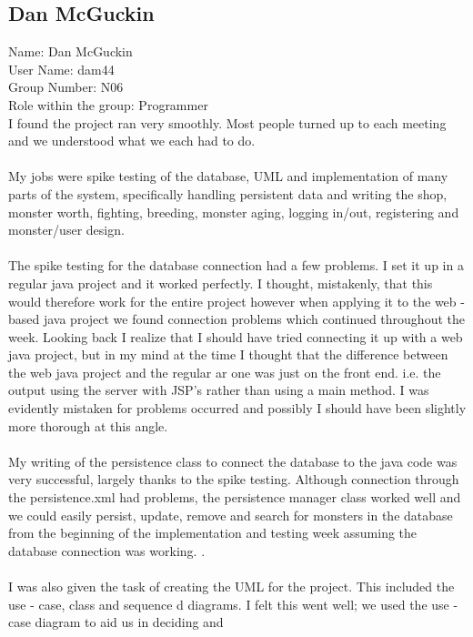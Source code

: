 \documentclass[titlepage]{article}
\begin{document}
{{{\subsection {Dan McGuckin}
\normalsize{Name: Dan McGuckin}
\\
\normalsize{User Name: dam44}
\\
\normalsize{Group Number: N06}
\\
\normalsize{Role within the group: Programmer}
\\
\normalsize {I found the project ran very smoothly. Most people turned up to each meeting and we understood 
what we each had to do. 
\\
\\
My jobs were spike testing of the database, UML and implementation of many parts of the system, 
specifically handling persistent data and writing the shop, monster worth, fighting, breeding, monster 
aging, logging in/out, registering and monster/user design. 
\\
\\
The spike testing for the database connection had a few problems. I set it up in a regular java project 
and it worked perfectly. I thought, mistakenly, that this would therefore work for the entire project 
however when applying it to the web
-
based java project 
we found connection problems which 
continued throughout the week. Looking back I realize that I should have tried connecting it up with a 
web java project, but in my mind at the time I thought that the difference between the web java 
project and the regular
ar one was just on the front end. i.e. the output using the server with JSP's rather 
than using a main method. I was evidently mistaken for problems occurred and possibly I should have 
been slightly more thorough at this angle. 
\\
\\
My writing of the persistence class to connect the database to the java code was very successful, 
largely thanks to the spike testing. Although connection through the persistence.xml had problems, 
the persistence manager class worked well and we could easily persist, update, remove 
and search for 
monsters in the database from the beginning of the implementation and testing week assuming the 
database connection was working. .
\\
\\
I was also given the task of creating the UML for the project. This included the use
-
case, class and 
sequence d
diagrams. I felt this went 
well; 
we used the use
-
case diagram to aid us in deciding and 
}}}}
\end{document}
